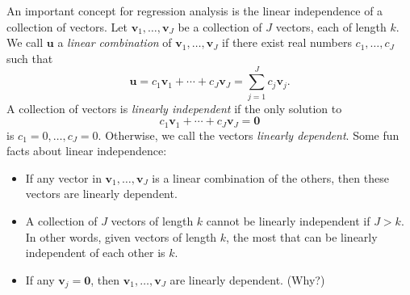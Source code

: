 \documentclass[
  12pt,
  oneside,openany]{book}
\begin{document}
An important concept for regression analysis is the linear independence of a collection of vectors. Let \(\mathbf{v}_1, \ldots, \mathbf{v}_J\) be a collection of \(J\) vectors, each of length \(k\). We call \(\mathbf{u}\) a \emph{linear combination} of \(\mathbf{v}_1, \ldots, \mathbf{v}_J\) if there exist real numbers \(c_1, \ldots, c_J\) such that
\[
\mathbf{u} = c_1 \mathbf{v}_1 + \cdots + c_J \mathbf{v}_J = \sum_{j=1}^J c_j \mathbf{v}_j.
\]
A collection of vectors is \emph{linearly independent} if the only solution to
\[
c_1 \mathbf{v}_1 + \cdots + c_J \mathbf{v}_J = \mathbf{0}
\]
is \(c_1 = 0, \ldots, c_J = 0\). Otherwise, we call the vectors \emph{linearly dependent}. Some fun facts about linear independence:

\begin{itemize}
\item
  If any vector in \(\mathbf{v}_1, \ldots, \mathbf{v}_J\) is a linear combination of the others, then these vectors are linearly dependent.
\item
  A collection of \(J\) vectors of length \(k\) cannot be linearly independent if \(J > k\). In other words, given vectors of length \(k\), the most that can be linearly independent of each other is \(k\).
\item
  If any \(\mathbf{v}_j = \mathbf{0}\), then \(\mathbf{v}_1, \ldots, \mathbf{v}_J\) are linearly dependent. (Why?)
\end{itemize}
\end{document}
